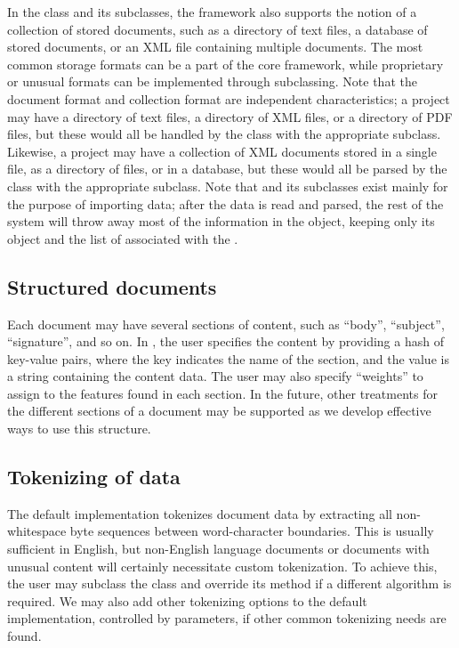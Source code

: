 \begin{singlespace}
In the  class and its subclasses, the framework
also supports the notion of a collection of stored documents, such as
a directory of text files, a database of stored documents, or an XML
file containing multiple documents.  The most common storage formats
can be a part of the core framework, while proprietary or unusual
formats can be implemented through subclassing.  Note that the
document format and collection format are independent characteristics;
a project may have a directory of text files, a directory of XML
files, or a directory of PDF files, but these would all be handled by
the  class with the appropriate
 subclass.  Likewise, a project may have a collection
of XML documents stored in a single file, as a directory of files, or
in a database, but these would all be parsed by the
 class with the appropriate 
subclass. Note that  and its subclasses exist mainly for
the purpose of importing data; after the data is read and parsed, the
rest of the system will throw away most of the information in the  object,
keeping only its  object and the list of
 associated with the .

\subsection*{Structured documents}
Each document may have several sections of content, such as ``body'',
``subject'', ``signature'', and so on.  In \aicat,
the user specifies the content by providing a hash of key-value pairs,
where the key indicates the name of the section, and the value is a
string containing the content data.  The user may also specify
``weights'' to assign to the features found in each section.  In the
future, other treatments for the different sections of a document may
be supported as we develop effective ways to use
this structure.


\subsection*{Tokenizing of data}
The default implementation tokenizes document data by extracting 
all non-whitespace byte sequences between word-character 
boundaries.  This is usually sufficient in English,
but non-English language documents or documents with unusual content
will certainly necessitate custom tokenization.  To achieve this, the
user may subclass the  class and override its
 method if a different algorithm is required.  We
may also add other tokenizing options to the default implementation,
controlled by parameters, if other common tokenizing needs are found.


\end{singlespace}
